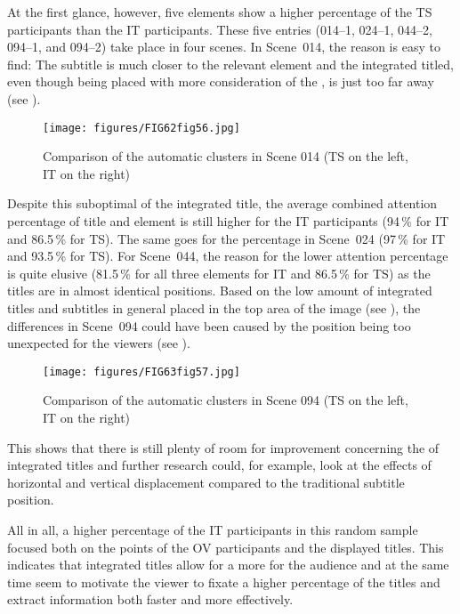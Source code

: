At the first glance, however, five elements show a higher  percentage of the TS participants than the IT participants. These five entries (014--1, 024--1, 044--2, 094--1, and 094--2) take place in four scenes. In Scene~014, the reason is easy to find: The subtitle is much closer to the relevant element and the integrated titled, even though being placed with more consideration of the , is just too far away (see ).
\clearpage 

\begin{figure}
\texttt{[image: figures/FIG62fig56.jpg]}
\caption{Comparison of the automatic clusters in Scene 014 (TS on the left, IT on the right)}
\label{fig:FIG62fig56}
\end{figure}

Despite this suboptimal  of the integrated title, the average combined attention percentage of title and element is still higher for the IT participants (94\,\% for IT and 86.5\,\% for TS). The same goes for the  percentage in Scene~024 (97\,\% for IT and 93.5\,\% for TS). For Scene~044, the reason for the lower attention percentage is quite elusive (81.5\,\%  for all three elements for IT and 86.5\,\% for TS) as the titles are in almost identical positions. Based on the low amount of integrated titles and subtitles in general placed in the top area of the image (see ), the differences in Scene~094 could have been caused by the position being too unexpected for the viewers (see ).

\begin{figure}
\texttt{[image: figures/FIG63fig57.jpg]}
\caption{Comparison of the automatic clusters in Scene 094 (TS on the left, IT on the right)}
\label{fig:FIG63fig57}
\end{figure}

This shows that there is still plenty of room for improvement concerning the  of integrated titles and further research could, for example, look at the effects of horizontal and vertical displacement compared to the traditional subtitle position.

All in all, a higher percentage of the IT participants in this random sample focused both on the  points of the OV participants and the displayed titles. This indicates that integrated titles allow for a more  for the audience and at the same time seem to motivate the viewer to fixate a higher percentage of the titles and extract information both faster and more effectively.

